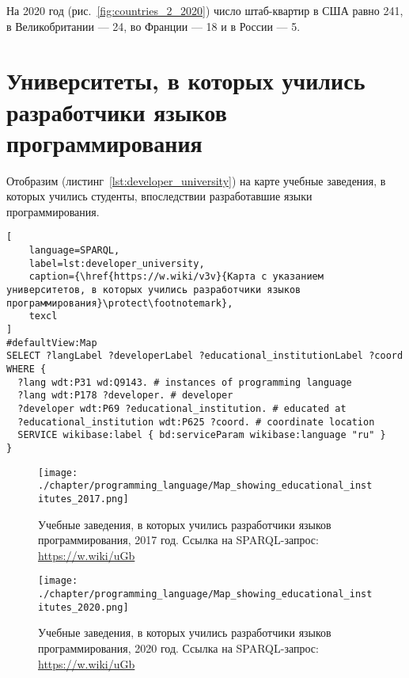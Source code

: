 На 2020 год (рис.~\ref{fig:countries_2_2020}) число штаб-квартир в США равно 241, в Великобритании — 24, во Франции — 18 и в России — 5.

\section{Университеты, в которых учились разработчики языков программирования}
Отобразим (листинг~\ref{lst:developer_university}) на карте учебные заведения, в которых учились студенты, впоследствии разработавшие языки программирования.

\begin{lstlisting}[
	language=SPARQL,
	label=lst:developer_university,
	caption={\href{https://w.wiki/v3v}{Карта с указанием университетов, в которых учились разработчики языков программирования}\protect\footnotemark},
	texcl
]
#defaultView:Map
SELECT ?langLabel ?developerLabel ?educational_institutionLabel ?coord
WHERE {
  ?lang wdt:P31 wd:Q9143. # instances of programming language
  ?lang wdt:P178 ?developer. # developer
  ?developer wdt:P69 ?educational_institution. # educated at
  ?educational_institution wdt:P625 ?coord. # coordinate location
  SERVICE wikibase:label { bd:serviceParam wikibase:language "ru" } 	
}
\end{lstlisting}

\begin{figure}[h]
\centering
	\texttt{[image: ./chapter/programming\_language/Map\_showing\_educational\_institutes\_2017.png]}
	\caption{Учебные заведения, в которых учились разработчики языков программирования, 2017 год. Ссылка на SPARQL-запрос: \href{https://w.wiki/uGb}{https://w.wiki/uGb}}
	\label{fig:universities_2017}
\end{figure}
\begin{figure}[h]
\centering
	\texttt{[image: ./chapter/programming\_language/Map\_showing\_educational\_institutes\_2020.png]}
	\caption{Учебные заведения, в которых учились разработчики языков программирования, 2020 год. Ссылка на SPARQL-запрос: \href{https://w.wiki/uGb}{https://w.wiki/uGb}}
	\label{fig:universities_2020}
\end{figure}

